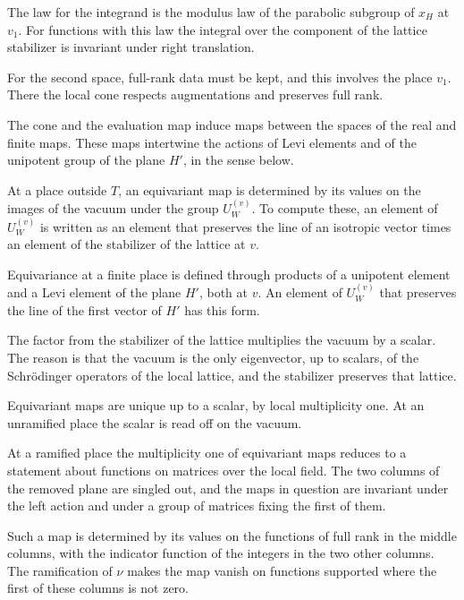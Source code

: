 The law for the integrand is the modulus law of the parabolic subgroup of
$x_H$ at $v_1$. For functions with this law the integral over the component of
the lattice stabilizer is invariant under right translation.

For the second space, full-rank data must be kept, and this involves the
place $v_1$. There the local cone respects augmentations and preserves full
rank.

The cone and the evaluation map induce maps between the spaces of the real
and finite maps. These maps intertwine the actions of Levi elements and of
the unipotent group of the plane $H'$, in the sense below.

At a place outside $T$, an equivariant map is determined by its values on the
images of the vacuum under the group $U_W^{(v)}$. To compute these, an element
of $U_W^{(v)}$ is written as an element that preserves the line of an isotropic
vector times an element of the stabilizer of the lattice at $v$.

Equivariance at a finite place is defined through products of a unipotent
element and a Levi element of the plane $H'$, both at $v$. An element of
$U_W^{(v)}$ that preserves the line of the first vector of $H'$ has this
form.

The factor from the stabilizer of the lattice multiplies the vacuum by a
scalar. The reason is that the vacuum is the only eigenvector, up to scalars,
of the Schrödinger operators of the local lattice, and the stabilizer
preserves that lattice.

Equivariant maps are unique up to a scalar, by local multiplicity one. At an
unramified place the scalar is read off on the vacuum.

At a ramified place the multiplicity one of equivariant maps reduces to a
statement about functions on matrices over the local field. The two columns of
the removed plane are singled out, and the maps in question are invariant under
the left action and under a group of matrices fixing the first of them.

Such a map is determined by its values on the functions of full rank in the
middle columns, with the indicator function of the integers in the two other
columns. The ramification of $\nu$ makes the map vanish on functions supported
where the first of these columns is not zero.

